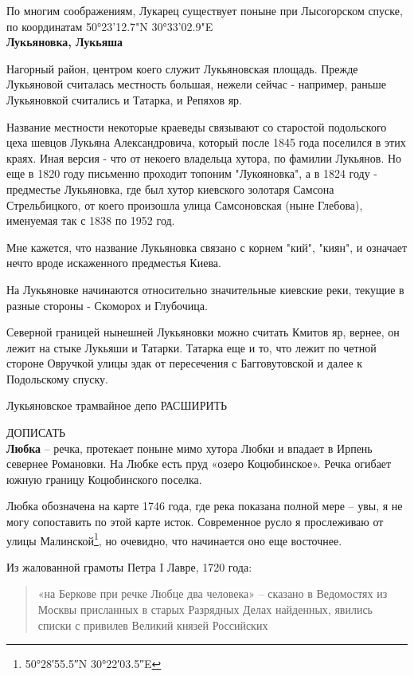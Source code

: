 По многим соображениям, Лукарец существует поныне при Лысогорском спуске, по координатам 50°23'12.7"N 30°33'02.9"E\\

\textbf{Лукьяновка, Лукьяша}

Нагорный район, центром коего служит Лукьяновская площадь. Прежде Лукьяновой считалась местность большая, нежели сейчас - например, раньше Лукьяновкой считались и Татарка, и Репяхов яр. 

Название местности некоторые краеведы связывают со старостой подольского цеха шевцов Лукьяна Александровича, который после 1845 года поселился в этих краях. Иная версия - что от некоего владельца хутора, по фамилии Лукьянов. Но еще в 1820 году письменно проходит топоним "Лукояновка", а в 1824 году - предместье Лукьяновка, где был хутор киевского золотаря Самсона Стрельбицкого, от коего произошла улица Самсоновская (ныне Глебова), именуемая так с 1838 по 1952 год.

Мне кажется, что название Лукьяновка связано с корнем "кий", "киян", и означает нечто вроде искаженного предместья Киева.

На Лукьяновке начинаются относительно значительные киевские реки, текущие в разные стороны - Скоморох и Глубочица.

Северной границей нынешней Лукьяновки можно считать Кмитов яр, вернее, он лежит на стыке Лукьяши и Татарки. Татарка еще и то, что лежит по четной стороне Овручкой улицы эдак от пересечения с Багговутовской и далее к Подольскому спуску.



Лукьяновское трамвайное депо РАСШИРИТЬ


ДОПИСАТЬ\\


\textbf{Любка} – речка, протекает поныне мимо хутора Любки и впадает в Ирпень севернее Романовки. На Любке есть пруд «озеро Коцюбинское». Речка огибает южную границу Коцюбинского поселка.

Любка обозначена на карте 1746 года, где река показана полной мере – увы, я не могу сопоставить по этой карте исток. Современное русло я прослеживаю от улицы Малинской\footnote{50°28′55.5″N 30°22′03.5″E}, но очевидно, что начинается оно еще восточнее. 

Из жалованной грамоты Петра I Лавре, 1720 года:

\begin{quotation}
«на Беркове при речке Любце два человека» – сказано в Ведомостях из Москвы присланных в старых Разрядных Делах найденных, явились списки с привилев Великий князей Российских
\end{quotation} 

